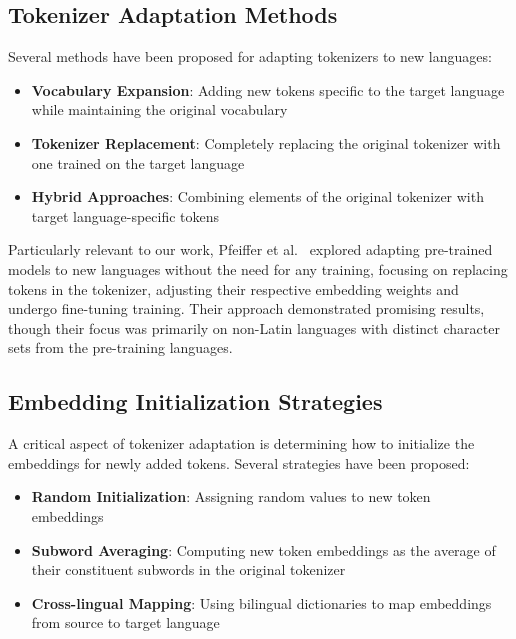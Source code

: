 \subsection{Tokenizer Adaptation Methods}
Several methods have been proposed for adapting tokenizers to new languages:

\begin{itemize}
    \item \textbf{Vocabulary Expansion}: Adding new tokens specific to the target language while maintaining the original vocabulary~\cite{https://www.semanticscholar.org/reader/6a8d467a5d36cdd5404fbb0a69835e7d0b5bee75}
    
    \item \textbf{Tokenizer Replacement}: Completely replacing the original tokenizer with one trained on the target language~\cite{https://arxiv.org/pdf/2012.15613}
    
    \item \textbf{Hybrid Approaches}: Combining elements of the original tokenizer with target language-specific tokens~\cite{AdaptinigPretrainedModels}
\end{itemize}

Particularly relevant to our work, Pfeiffer et al.~\cite{AdaptinigPretrainedModels} explored adapting pre-trained models to new languages without the need for any training, focusing on replacing tokens in the tokenizer, adjusting their respective embedding weights and undergo fine-tuning training. Their approach demonstrated promising results, though their focus was primarily on non-Latin languages with distinct character sets from the pre-training languages.

\subsection{Embedding Initialization Strategies}
A critical aspect of tokenizer adaptation is determining how to initialize the embeddings for newly added tokens. Several strategies have been proposed:

\begin{itemize}
    \item \textbf{Random Initialization}: Assigning random values to new token embeddings~\cite{https://www.semanticscholar.org/reader/59c0c6b62e33850cda08663d4c9ecabcf5d21596}
    
    \item \textbf{Subword Averaging}: Computing new token embeddings as the average of their constituent subwords in the original tokenizer~\cite{AdaptinigPretrainedModels}
    
    \item \textbf{Cross-lingual Mapping}: Using bilingual dictionaries to map embeddings from source to target language~\cite{artetxe2018robust}
\end{itemize}

